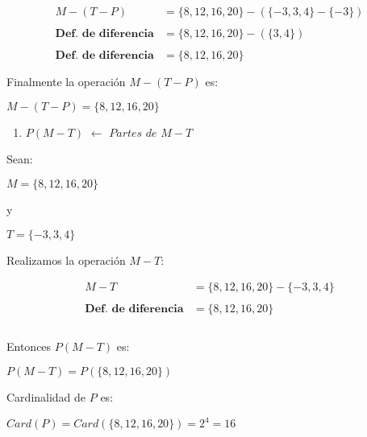 \documentclass[12pt]{article}
\begin{document}
\begin{equation}
    \begin{split}
        M-(T-P) & = \{8, 12, 16, 20\} - (\{-3,3,4\}-\{-3\}) \\\\ \textbf{Def. de diferencia}
         & =  \{8, 12, 16, 20\} - (\{3,4\})\\\\ \textbf{Def. de diferencia}
        & = \{8, 12, 16, 20\} \\\\
    \end{split}
\end{equation}
Finalmente la operación $M-(T-P)$ es:

\begin{center}
   $M-(T-P)=\{8, 12, 16, 20\}$
\end{center}
\newpage
\begin{enumerate}
        \item [\blue{b)}]$P(M-T)$ $\leftarrow$ $Partes$ $de$  $M-T$
\end{enumerate}

Sean:

\begin{center}
   $M=\{8, 12, 16, 20\}$ 
\end{center}
\begin{center}
    y
\end{center}
\begin{center}
    $T = \{-3, 3, 4\}$
\end{center}

Realizamos la operación $M-T$:

\begin{equation}
    \begin{split}
        M-T & = \{8, 12, 16, 20\} - \{-3,3,4\} \\\\ \textbf{Def. de diferencia}
         & =  \{8, 12, 16, 20\}\\\\ 
    \end{split}
\end{equation}

Entonces $P(M-T)$ es:

\begin{center}
    $P(M-T) = P(\{8, 12, 16, 20\})$
\end{center}

Cardinalidad de $P$ es: 

\begin{center}
    $Card(P) = Card(\{8, 12, 16, 20\})= 2^4 = 16$
\end{center}
\end{document}
